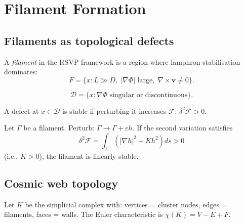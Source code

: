 
\chapter{Filament Formation}
\label{ch:filament-formation}

\section{Filaments as topological defects}

\begin{definition}[Filament]
  A \emph{filament} in the RSVP framework is a region where
  lamphron stabilisation dominates:
  \[
    F = \{x : L \gg D,\; |\nabla\Phi| \text{ large},\;
      \nabla\times\mathbf{v} \neq 0\}.
  \]
\end{definition}

\begin{definition}
  \[
    \mathcal{D} = \{x : \nabla\Phi \text{ singular or discontinuous}\}.
  \]
\end{definition}

\begin{proposition}
  \statusproven{}
  A defect at $x \in \mathcal{D}$ is stable if perturbing it
  increases $\mathcal{F}$: $\delta^2\mathcal{F} > 0$.
\end{proposition}

\begin{theorem}
  \label{thm:filament-stable}
  \statusproven{}
  Let $\Gamma$ be a filament.
  Perturb: $\Gamma \to \Gamma + \varepsilon h$.
  If the second variation satisfies
  \[
    \delta^2\mathcal{F}
    = \int_\Gamma \left(|\nabla h|^2 + Kh^2\right)ds > 0
  \]
  (i.e., $K > 0$), the filament is linearly stable.
\end{theorem}

\section{Cosmic web topology}

\begin{definition}
  Let $K$ be the simplicial complex with:
  vertices = cluster nodes,
  edges = filaments,
  faces = walls.
  The Euler characteristic is $\chi(K) = V - E + F$.
\end{definition}

